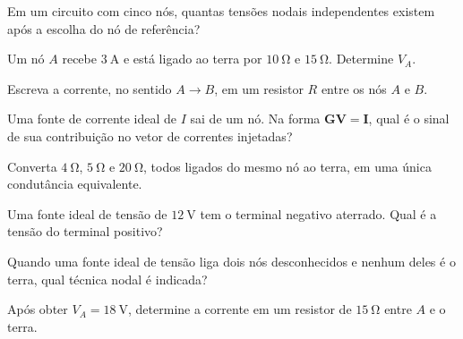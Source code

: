 \blocofixacao
\begin{questao}[1]{}

Em um circuito com cinco nós, quantas tensões nodais independentes existem após a escolha do nó de referência?


\end{questao}
\begin{questao}[1]{}

Um nó $A$ recebe $\SI{3}{\ampere}$ e está ligado ao terra por $\SI{10}{\ohm}$ e $\SI{15}{\ohm}$. Determine $V_A$.


\end{questao}
\begin{questao}[1]{}

Escreva a corrente, no sentido $A\to B$, em um resistor $R$ entre os nós $A$ e $B$.


\end{questao}
\begin{questao}[1]{}

Uma fonte de corrente ideal de $I$ sai de um nó. Na forma $\mathbf G\mathbf V=\mathbf I$, qual é o sinal de sua contribuição no vetor de correntes injetadas?


\end{questao}
\begin{questao}[1]{}

Converta $\SI{4}{\ohm}$, $\SI{5}{\ohm}$ e $\SI{20}{\ohm}$, todos ligados do mesmo nó ao terra, em uma única condutância equivalente.


\end{questao}
\begin{questao}[1]{}

Uma fonte ideal de tensão de $\SI{12}{\volt}$ tem o terminal negativo aterrado. Qual é a tensão do terminal positivo?


\end{questao}
\begin{questao}[1]{}

Quando uma fonte ideal de tensão liga dois nós desconhecidos e nenhum deles é o terra, qual técnica nodal é indicada?


\end{questao}
\begin{questao}[1]{}

Após obter $V_A=\SI{18}{\volt}$, determine a corrente em um resistor de $\SI{15}{\ohm}$ entre $A$ e o terra.


\end{questao}

